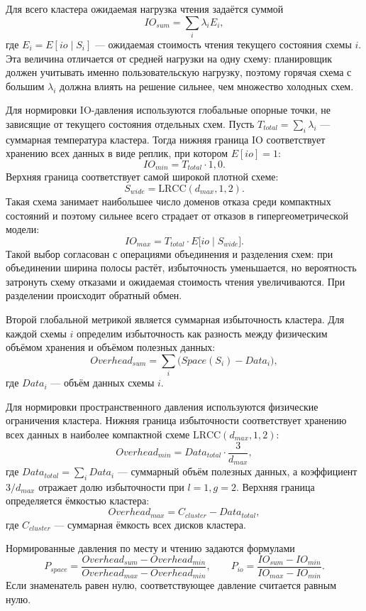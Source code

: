 Для всего кластера ожидаемая нагрузка чтения задаётся суммой
\[
    IO_{sum} = \sum_i \lambda_i E_i,
\]
где \(E_i = E[io \mid S_i]\) --- ожидаемая стоимость чтения текущего состояния
схемы \(i\). Эта величина отличается от средней нагрузки на одну схему:
планировщик должен учитывать именно пользовательскую нагрузку, поэтому горячая
схема с большим \(\lambda_i\) должна влиять на решение сильнее, чем множество
холодных схем.

Для нормировки IO-давления используются глобальные опорные точки, не зависящие
от текущего состояния отдельных схем. Пусть \(T_{total} = \sum_i \lambda_i\) ---
суммарная температура кластера. Тогда нижняя граница IO соответствует хранению
всех данных в виде реплик, при котором \(E[io] = 1\):
\[
    IO_{min} = T_{total} \cdot 1{,}0.
\]
Верхняя граница соответствует самой широкой плотной схеме:
\[
    S_{wide}=\mathrm{LRCC}(d_{max}, 1, 2).
\]
Такая схема занимает наибольшее число доменов отказа среди компактных
состояний и поэтому сильнее всего страдает от отказов в гипергеометрической
модели:
\[
    IO_{max} =
    T_{total} \cdot
    E\bigl[io \mid S_{wide}\bigr].
\]
Такой выбор согласован с операциями объединения и разделения схем: при
объединении ширина полосы растёт, избыточность уменьшается, но вероятность
затронуть схему отказами и ожидаемая стоимость чтения увеличиваются. При
разделении происходит обратный обмен.

Второй глобальной метрикой является суммарная избыточность кластера. Для каждой
схемы \(i\) определим избыточность как разность между физическим объёмом хранения и
объёмом полезных данных:
\[
    Overhead_{sum} = \sum_i \bigl(Space(S_i) - Data_i\bigr),
\]
где \(Data_i\) --- объём данных схемы \(i\).

Для нормировки пространственного давления используются физические ограничения
кластера. Нижняя граница избыточности соответствует хранению всех данных в наиболее
компактной схеме \(\mathrm{LRCC}(d_{max}, 1, 2)\):
\[
    Overhead_{min} = Data_{total} \cdot \frac{3}{d_{max}},
\]
где \(Data_{total} = \sum_i Data_i\) --- суммарный объём полезных данных, а
коэффициент \(3/d_{max}\) отражает долю избыточности при \(l=1, g=2\).
Верхняя граница определяется ёмкостью кластера:
\[
    Overhead_{max} = C_{cluster} - Data_{total},
\]
где \(C_{cluster}\) --- суммарная ёмкость всех дисков кластера.

Нормированные давления по месту и чтению задаются формулами
\[
    P_{space} =
    \frac{Overhead_{sum} - Overhead_{min}}{Overhead_{max} - Overhead_{min}},
    \qquad
    P_{io} =
    \frac{IO_{sum} - IO_{min}}{IO_{max} - IO_{min}}.
\]
Если знаменатель равен нулю, соответствующее давление считается равным нулю.

